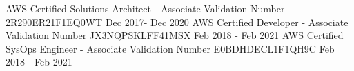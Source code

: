 

\begin{cvcerts}

  \cvcert
    {AWS Certified Solutions Architect - Associate} %
    {Validation Number 2R290ER21F1EQ0WT}
    {Dec 2017- Dec 2020} %
  \cvcert
    {AWS Certified Developer - Associate} %
    {Validation Number JX3NQPSKLFF41MSX}
    {Feb 2018 - Feb 2021} %
  \cvcert
    {AWS Certified SysOps Engineer - Associate} %
    {Validation Number E0BDHDECL1F1QH9C}
    {Feb 2018 - Feb 2021} %
\end{cvcerts}
